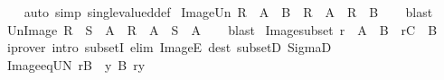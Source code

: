 \begin{isabellebody}
%
\isadelimproof
\ \ %
\endisadelimproof
%
\isatagproof
{}\isamarkupfalse%
\ {\isacharparenleft}{\kern0pt}auto\ simp{\isacharcolon}{\kern0pt}\ single{\isacharunderscore}{\kern0pt}valued{\isacharunderscore}{\kern0pt}def{\isacharparenright}{\kern0pt}%
\endisatagproof
{\isafoldproof}%
%
\isadelimproof
\isanewline
%
\endisadelimproof
\isanewline
{}\isamarkupfalse%
\ Image{\isacharunderscore}{\kern0pt}Un{\isacharcolon}{\kern0pt}\ {\isachardoublequoteopen}R\ {\isacharbackquote}{\kern0pt}{\isacharbackquote}{\kern0pt}\ {\isacharparenleft}{\kern0pt}A\ {\isasymunion}\ B{\isacharparenright}{\kern0pt}\ {\isacharequal}{\kern0pt}\ R\ {\isacharbackquote}{\kern0pt}{\isacharbackquote}{\kern0pt}\ A\ {\isasymunion}\ R\ {\isacharbackquote}{\kern0pt}{\isacharbackquote}{\kern0pt}\ B{\isachardoublequoteclose}\isanewline
%
\isadelimproof
\ \ %
\endisadelimproof
%
\isatagproof
{}\isamarkupfalse%
\ blast%
\endisatagproof
{\isafoldproof}%
%
\isadelimproof
\isanewline
%
\endisadelimproof
\isanewline
{}\isamarkupfalse%
\ Un{\isacharunderscore}{\kern0pt}Image{\isacharcolon}{\kern0pt}\ {\isachardoublequoteopen}{\isacharparenleft}{\kern0pt}R\ {\isasymunion}\ S{\isacharparenright}{\kern0pt}\ {\isacharbackquote}{\kern0pt}{\isacharbackquote}{\kern0pt}\ A\ {\isacharequal}{\kern0pt}\ R\ {\isacharbackquote}{\kern0pt}{\isacharbackquote}{\kern0pt}\ A\ {\isasymunion}\ S\ {\isacharbackquote}{\kern0pt}{\isacharbackquote}{\kern0pt}\ A{\isachardoublequoteclose}\isanewline
%
\isadelimproof
\ \ %
\endisadelimproof
%
\isatagproof
{}\isamarkupfalse%
\ blast%
\endisatagproof
{\isafoldproof}%
%
\isadelimproof
\isanewline
%
\endisadelimproof
\isanewline
{}\isamarkupfalse%
\ Image{\isacharunderscore}{\kern0pt}subset{\isacharcolon}{\kern0pt}\ {\isachardoublequoteopen}r\ {\isasymsubseteq}\ A\ {\isasymtimes}\ B\ {\isasymLongrightarrow}\ r{\isacharbackquote}{\kern0pt}{\isacharbackquote}{\kern0pt}C\ {\isasymsubseteq}\ B{\isachardoublequoteclose}\isanewline
%
\isadelimproof
\ \ %
\endisadelimproof
%
\isatagproof
{}\isamarkupfalse%
\ {\isacharparenleft}{\kern0pt}iprover\ intro{\isacharbang}{\kern0pt}{\isacharcolon}{\kern0pt}\ subsetI\ elim{\isacharbang}{\kern0pt}{\isacharcolon}{\kern0pt}\ ImageE\ dest{\isacharbang}{\kern0pt}{\isacharcolon}{\kern0pt}\ subsetD\ SigmaD{}{\isacharparenright}{\kern0pt}%
\endisatagproof
{\isafoldproof}%
%
\isadelimproof
\isanewline
%
\endisadelimproof
\isanewline
{}\isamarkupfalse%
\ Image{\isacharunderscore}{\kern0pt}eq{\isacharunderscore}{\kern0pt}UN{\isacharcolon}{\kern0pt}\ {\isachardoublequoteopen}r{\isacharbackquote}{\kern0pt}{\isacharbackquote}{\kern0pt}B\ {\isacharequal}{\kern0pt}\ {\isacharparenleft}{\kern0pt}{\isasymUnion}y{\isasymin}\ B{\isachardot}{\kern0pt}\ r{\isacharbackquote}{\kern0pt}{\isacharbackquote}{\kern0pt}{\isacharbraceleft}{\kern0pt}y{\isacharbraceright}{\kern0pt}{\isacharparenright}{\kern0pt}{\isachardoublequoteclose}\isanewline

\end{isabellebody}
